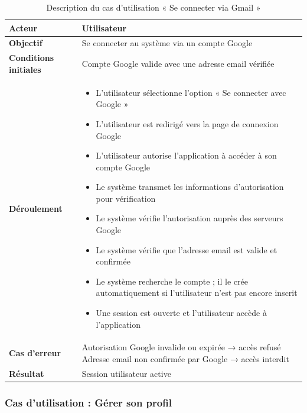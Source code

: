 \begin{table}[H]
\centering
\renewcommand{\arraystretch}{1.2}
\begin{tabular}{|p{4cm}|p{10cm}|}
\hline
\textbf{Acteur} & Utilisateur \\ \hline

\textbf{Objectif} & Se connecter au système via un compte Google \\ \hline

\textbf{Conditions initiales} & Compte Google valide avec une adresse email vérifiée \\ \hline

\textbf{Déroulement} &
\begin{itemize}
    \item L’utilisateur sélectionne l’option « Se connecter avec Google »
    \item L’utilisateur est redirigé vers la page de connexion Google
    \item L’utilisateur autorise l’application à accéder à son compte Google
    \item Le système transmet les informations d’autorisation pour vérification
    \item Le système vérifie l’autorisation auprès des serveurs Google
    \item Le système vérifie que l’adresse email est valide et confirmée
    \item Le système recherche le compte ; il le crée automatiquement si l’utilisateur n’est pas encore inscrit
    \item Une session est ouverte et l’utilisateur accède à l’application
\end{itemize} \\ \hline

\textbf{Cas d’erreur} & Autorisation Google invalide ou expirée → accès refusé \newline Adresse email non confirmée par Google → accès interdit \\ \hline

\textbf{Résultat} & Session utilisateur active \\ \hline
\end{tabular}
\caption{Description du cas d’utilisation « Se connecter via Gmail »}
\label{tab:uc_login_google}
\end{table}

\subsubsection{Cas d’utilisation : Gérer son profil}

